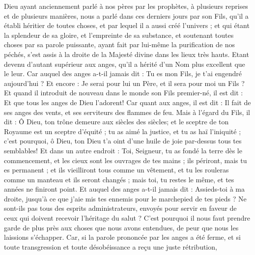 \begin{multicols}{2}
\VerseOne{}Dieu ayant anciennement parlé à nos pères par les prophètes, à plusieurs reprises et de plusieurs manières,
nous a parlé dans ces derniers jours par son Fils, qu'il a établi héritier de toutes choses, et par lequel il a aussi créé l'univers ;
et qui étant la splendeur de sa gloire, et l'empreinte de sa substance, et soutenant toutes choses par sa parole puissante, ayant fait par lui-même la purification de nos péchés, s'est assis à la droite de la Majesté divine dans les lieux très hauts.
Etant devenu d'autant supérieur aux anges, qu'il a hérité d'un Nom plus excellent que le leur.
Car auquel des anges a-t-il jamais dit : Tu es mon Fils, je t'ai engendré aujourd'hui ? Et encore : Je serai pour lui un Père, et il sera pour moi un Fils ?
Et quand il introduit de nouveau dans le monde son Fils premier-né, il est dit : Et que tous les anges de Dieu l'adorent!
Car quant aux anges, il est dit : Il fait de ses anges des vents, et ses serviteurs des flammes de feu.
Mais à l'égard du Fils, il dit : Ô Dieu, ton trône demeure aux siècles des siècles; et le sceptre de ton Royaume est un sceptre d'équité ;
tu as aimé la justice, et tu as haï l'iniquité ; c'est pourquoi, ô Dieu, ton Dieu t'a oint d'une huile de joie par-dessus tous tes semblables!
Et dans un autre endroit : Toi, Seigneur, tu as fondé la terre dès le commencement, et les cieux sont les ouvrages de tes mains ;
ils périront, mais tu es permanent ; et ils vieilliront tous comme un vêtement,
et tu les rouleras comme un manteau et ils seront changés ; mais toi, tu restes le même, et tes années ne finiront point.
Et auquel des anges a-t-il jamais dit : Assieds-toi à ma droite, jusqu'à ce que j'aie mis tes ennemis pour le marchepied de tes pieds ?
Ne sont-ils pas tous des esprits administrateurs, envoyés pour servir en faveur de ceux qui doivent recevoir l'héritage du salut ?
\VerseOne{}C'est pourquoi il nous faut prendre garde de plus près aux choses que nous avons entendues, de peur que nous les laissions s'échapper.
Car, si la parole prononcée par les anges a été ferme, et si toute transgression et toute désobéissance a reçu une juste rétribution,

\end{multicols}
